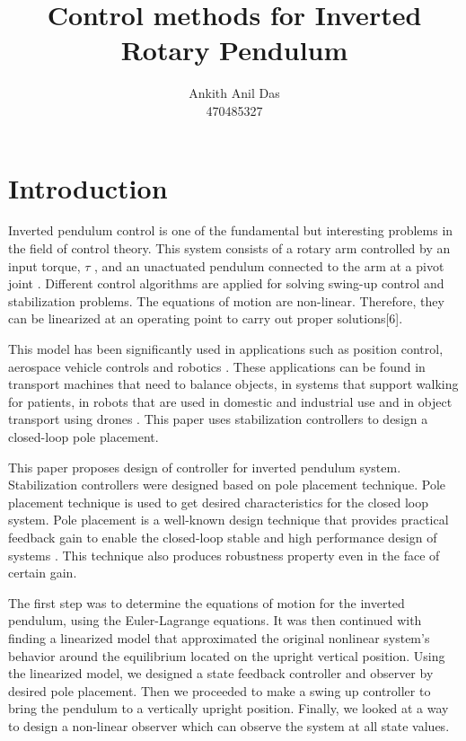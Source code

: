 \documentclass[superscriptaddress,floatfix,reprint,amssymb, amsmath,aps, pre]{revtex4-1}
\begin{document}
{
    \title{Control methods for Inverted Rotary Pendulum}
    \author{Ankith Anil Das\\
    470485327}

    \maketitle

    \section{Introduction}{
        Inverted pendulum control is one of the fundamental but interesting problems in the field of control theory. This system consists of a rotary arm controlled by an input torque, \(\tau\) , and an unactuated pendulum connected to the arm at a pivot joint . Different control algorithms are applied for solving swing-up control and stabilization problems. The equations of motion are non-linear. Therefore, they can be linearized at an operating point to carry out proper solutions[6]. 

        This model has been significantly used in applications such as position control, aerospace vehicle controls and robotics \cite{wolenski_controller_2011}. These applications can be found in transport machines that need to balance objects, in systems that support walking for patients, in robots that are used in domestic and industrial use and in object transport using drones \cite{kafetzis_inverted_2017}. This paper uses stabilization controllers to design a closed-loop pole placement. 

        This paper proposes design of controller for inverted pendulum system. Stabilization controllers were designed based on pole placement technique. Pole placement technique is used to get desired characteristics for the closed loop system. Pole placement is a well-known design technique that provides practical feedback gain to enable the closed-loop stable and high performance design of systems \cite{noauthor_lqr_nodate}. This technique also produces robustness property even in the face of certain gain.

        The first step was to determine the equations of motion for the inverted pendulum, using the Euler-Lagrange equations. It was then continued with finding a linearized model that approximated the original nonlinear system’s behavior around the equilibrium located on the upright vertical position. Using the linearized model, we designed a state feedback controller and observer by desired pole placement. Then we proceeded to make a swing up controller to bring the pendulum to a vertically upright position. Finally, we looked at a way to design a non-linear observer which can observe the system at all state values. 
    }
}
\end{document}
